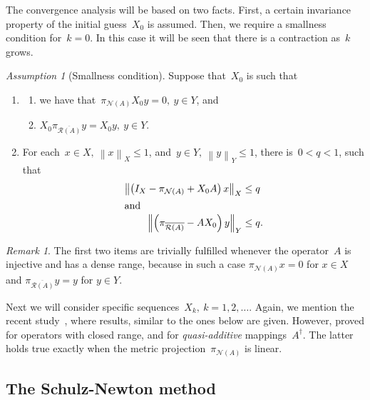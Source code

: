 \documentclass[12pt]{amsart}
\newcommand{\norm}[2]{\left\|#1\right\|_{#2}}
\newcommand{\lr}[1]{\left(#1\right)}
\newcommand{\range}{\mathcal R}
\newcommand{\N}{\mathcal N}
\newcommand{\Ad}{A^\dag}
\theoremstyle{remark}
\newtheorem{remark}{Remark}
\newtheorem{assumption}{Assumption}
\begin{document}
The convergence
analysis will be based on two facts. First, 
a certain invariance property of the initial guess~$X_0$ is assumed. Then, we require a smallness
condition for~$k=0$. In this case it will be seen that there is a contraction
as~$k$ grows.
\begin{assumption}[Smallness condition]\label{ass:smallness}
  Suppose that~$X_{0}$ is such that
  \begin{enumerate}
  \item\label{it:invariance}
    \begin{enumerate}
    \item  we have that~$\pi_{\N(A)}X_{0}y=0,\ y\in Y$, and
    \item $X_{0}\pi_{\overline{\range(A)}}y=X_{0}y,\ y\in Y$.
    \end{enumerate}
  \item \label{it:small} For each~$x\in X,\ \norm{x}{X}\leq 1$, and~$y\in Y,\ \norm{y}{Y}\leq 1$, there is~$0< q <1$, such
    that
    \begin{align}
    \norm{\lr{I_{X} -\pi_{\N(A)} + X_{0}A}x}{X} &\leq q\label{eq:6}\\
     \intertext{and}
\norm{\lr{\pi_{\overline{\range(A)}} - A X_{0}}y}{Y}&\leq q.
   \end{align}
  \end{enumerate}
\end{assumption}
  \begin{remark}
  The first two items are trivially fulfilled whenever the
  operator~$A$ is injective and has a dense range, because in such a case
$\pi_{\N(A)}x=0$ for $x\in X$ and $\pi_{\overline{\range(A)}}y=y$ for $y \in Y$.
\end{remark}
Next we  will consider specific sequences~$X_{k},\ k=1,2,\dots$. Again, we mention
the recent study~\cite{MR5022356}, where results, similar to the ones
below are given. However, proved for operators with closed range, and
for \emph{quasi-additive} mappings~$\Ad$. The latter holds true
exactly when the metric projection~$\pi_{\N(A)}$ is linear.
\subsection{The Schulz-Newton method}
\label{sec:second-order-scheme}
\end{document}
